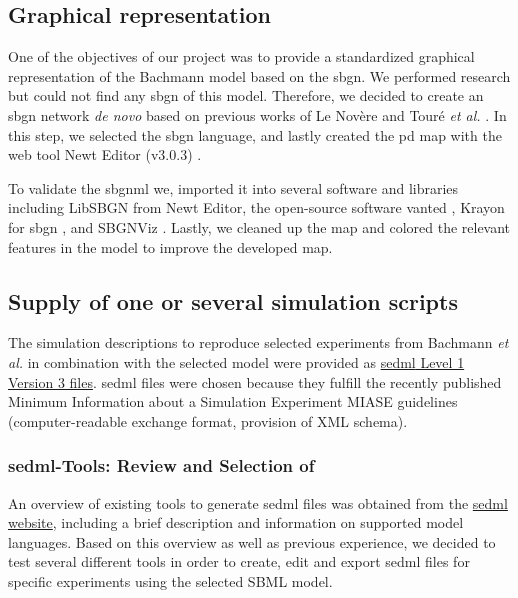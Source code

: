 \subsection*{Graphical representation}
One of the objectives of our project was to provide a standardized graphical representation of the Bachmann model based on the \ac{sbgn}. We performed research but could not find any \ac{sbgn} of this model. Therefore, we decided to create an \ac{sbgn} network \textit{de novo} based on previous works of Le Novère \cite{sbgnnovere} and Touré \textit{et al.} \cite{sbgntoure}. In this step, we selected the \ac{sbgn} language, and lastly created the \ac{pd} map with the web tool Newt Editor (v3.0.3) \cite{newteditor}. 

To validate the \ac{sbgnml} we, imported it into several software and libraries including LibSBGN from Newt Editor, the open-source software \ac{vanted} \cite{vanted}, Krayon for \ac{sbgn} \cite{krayon}, and SBGNViz \cite{sbgnviz}. Lastly, we cleaned up the map and colored the relevant features in the model to improve the developed map.

\subsection*{Supply of one or several simulation scripts}
The simulation descriptions to reproduce selected experiments from Bachmann \textit{et al.} \cite{bachmannmodel} in combination with the selected model were provided as \hyperlink{https://sed-ml.org/}{\acs{sedml} Level 1 Version 3 files}. \ac{sedml} files were chosen because they fulfill
the recently published Minimum Information about a Simulation Experiment \ac{MIASE} guidelines (computer-readable exchange format, provision of XML schema).

\subsubsection*{\acs{sedml}-Tools: Review and Selection of }
An overview of existing tools to generate \ac{sedml} files was obtained from the \hyperlink{http://sed-ml.org/}{\acs{sedml} website}, including a brief description and information on supported model languages. Based on this overview as well as previous experience, we decided to test several different tools in order to create, edit and export \ac{sedml} files for specific experiments using the selected SBML model. 

